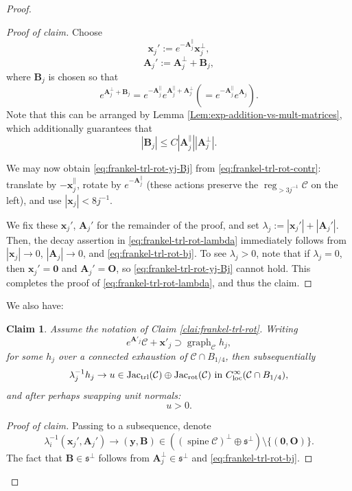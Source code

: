 \documentclass[11pt, letterpaper, reqno]{amsart}
\numberwithin{equation}{section}
\newtheorem{Cla}[Def]{Claim}
\theoremstyle{remark}
\newcommand{\cC}{\mathcal{C}}
\newcommand{\mbfA}{\mathbf{A}}
\newcommand{\mbfB}{\mathbf{B}}
\newcommand{\mbfO}{\mathbf{O}}
\newcommand{\mbfx}{\mathbf{x}}
\newcommand{\mbfy}{\mathbf{y}}
\newcommand{\graph}{\operatorname{graph}}
\newcommand{\reg}{\operatorname{reg}}
\newcommand{\Jac}{\operatorname{Jac}}
\newcommand{\spine}{\operatorname{spine}}
\newcommand{\orig}{\mathbf{0}}
\begin{document}
\begin{proof}
\begin{proof}[Proof of claim]
Choose
\[ \mbfx_j' := e^{-\mbfA_j^\parallel} \mbfx_j^\perp, \]
\[ \mbfA_j' := \mbfA_j^\perp + \mbfB_j, \]
where $\mbfB_j$ is chosen so that
\[ e^{\mbfA_j^\perp + \mbfB_j} = e^{-\mbfA_j^\parallel} e^{\mbfA_j^\parallel + \mbfA_j^\perp} (= e^{-\mbfA_j^\parallel} e^{\mbfA_j}). \]
Note that this can be arranged by Lemma \ref{Lem:exp-addition-vs-mult-matrices}, which additionally guarantees that
\begin{equation} \label{eq:frankel-trl-rot-bj}
	|\mbfB_j| \leq C |\mbfA_j^\parallel| |\mbfA_j^\perp|.
\end{equation}

We may now obtain \eqref{eq:frankel-trl-rot-yj-Bj} from \eqref{eq:frankel-trl-rot-contr}: translate by $-\mbfx_j^\parallel$, rotate by $e^{-\mbfA_j^\parallel}$ (these actions preserve the $\reg_{>3j^{-1}} \cC$ on the left), and use $|\mbfx_j| < 8j^{-1}$.

We fix these $\mbfx_j'$, $\mbfA_j'$ for the remainder of the proof, and set $\lambda_j := |\mbfx_j'| + |\mbfA_j'|$. Then, the decay assertion in \eqref{eq:frankel-trl-rot-lambda} immediately follows from $|\mbfx_j| \to 0$, $|\mbfA_j| \to 0$, and \eqref{eq:frankel-trl-rot-bj}. To see $\lambda_j > 0$, note that if $\lambda_j = 0$, then $\mbfx_j' = \orig$ and $\mbfA_j' = \mbfO$, so \eqref{eq:frankel-trl-rot-yj-Bj} cannot hold. This completes the proof of \eqref{eq:frankel-trl-rot-lambda}, and thus the claim.
\end{proof}

We also have:

\begin{Cla} \label{clai:frankel-trl-rot-jf}
    Assume the notation of Claim \ref{clai:frankel-trl-rot}. Writing 
    \[
	e^{\mbfA'_j} \cC + \mbfx'_j \supset \graph_\cC h_j,
    \]
    for some $h_j$ over a connected exhaustion of $\cC \cap B_{1/4}$, then subsequentially
    \begin{equation} \label{eq:frankel-trl-rot-linearized}
	\lambda_j^{-1} h_j \to u \in \Jac_\textnormal{trl}(\cC) \oplus \Jac_\textnormal{rot}(\cC) \text{ in } C^\infty_{\textnormal{loc}}(\cC \cap B_{1/4}),
    \end{equation}
    and after perhaps swapping unit normals:
    \begin{equation} \label{eq:frankel-trl-rot-linearized-2}
        u > 0.
    \end{equation}
\end{Cla}
\begin{proof}[Proof of claim]
    Passing to a subsequence, denote
    \begin{equation} \label{eq:frankel-trl-rot-yB}
	\lambda_i^{-1} (\mbfx_j', \mbfA_j') \to (\mbfy, \mbfB) \in ((\spine \cC)^\perp \oplus \mathfrak{s}^\perp) \setminus \{ (\orig, \mbfO) \}.
    \end{equation}
    The fact that $\mbfB \in \mathfrak{s}^\perp$ follows from $\mbfA_j^\perp \in \mathfrak{s}^\perp$ and \eqref{eq:frankel-trl-rot-bj}. 


\end{proof}
\end{proof}
\end{document}
